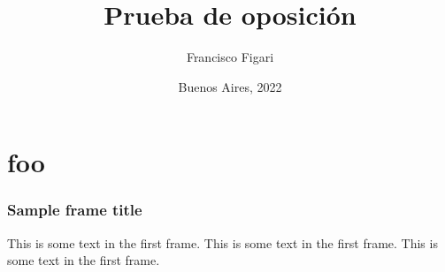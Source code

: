 \documentclass{beamer}
\title{Prueba de oposición}
\author{Francisco Figari}
\date{Buenos Aires, 2022}
\begin{document}
\frame{\titlepage}

\section{foo}

\begin{frame}
\frametitle{Sample frame title}
This is some text in the first frame. This is some text in the first frame. This is some text in the first frame.
\end{frame}
\end{document}

